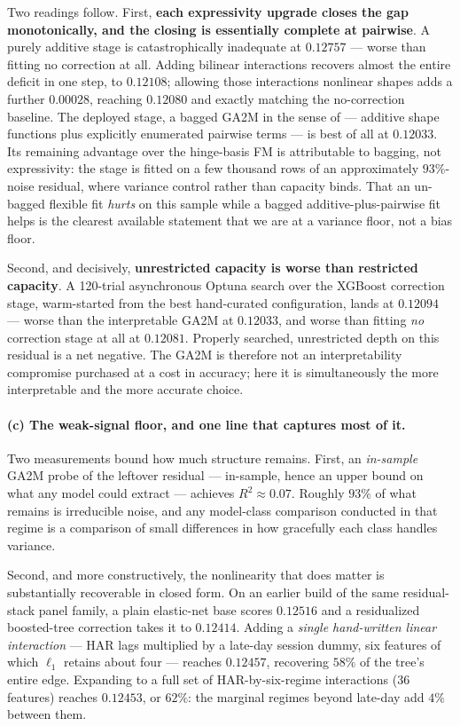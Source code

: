 Two readings follow. First, \textbf{each expressivity upgrade closes the gap
monotonically, and the closing is essentially complete at pairwise}. A purely
additive stage is catastrophically inadequate at $0.12757$ --- worse than fitting
no correction at all. Adding bilinear interactions recovers almost the entire
deficit in one step, to $0.12108$; allowing those interactions nonlinear shapes
adds a further $0.00028$, reaching $0.12080$ and exactly matching the
no-correction baseline. The deployed stage, a bagged GA2M in the sense of
\citet{Lou2013} --- additive shape functions plus explicitly enumerated pairwise
terms --- is best of all at $0.12033$. Its remaining advantage over the
hinge-basis FM is attributable to bagging, not expressivity: the stage is fitted
on a few thousand rows of an approximately $93\%$-noise residual, where variance
control rather than capacity binds. That an un-bagged flexible fit \emph{hurts}
on this sample while a bagged additive-plus-pairwise fit helps is the clearest
available statement that we are at a variance floor, not a bias floor.

Second, and decisively, \textbf{unrestricted capacity is worse than restricted
capacity}. A 120-trial asynchronous Optuna search over the XGBoost correction
stage, warm-started from the best hand-curated configuration, lands at $0.12094$
--- worse than the interpretable GA2M at $0.12033$, and worse than fitting
\emph{no} correction stage at all at $0.12081$. Properly searched, unrestricted
depth on this residual is a net negative. The GA2M is therefore not an
interpretability compromise purchased at a cost in accuracy; here it is
simultaneously the more interpretable and the more accurate choice.

\paragraph{(c) The weak-signal floor, and one line that captures most of it.}
Two measurements bound how much structure remains. First, an \emph{in-sample}
GA2M probe of the leftover residual --- in-sample, hence an upper bound on what
any model could extract --- achieves $R^2 \approx 0.07$. Roughly $93\%$ of what
remains is irreducible noise, and any model-class comparison conducted in that
regime is a comparison of small differences in how gracefully each class handles
variance.

Second, and more constructively, the nonlinearity that does matter is
substantially recoverable in closed form. On an earlier build of the same
residual-stack panel family, a plain elastic-net base scores $0.12516$ and a
residualized boosted-tree correction takes it to $0.12414$. Adding a \emph{single
hand-written linear interaction} --- HAR lags multiplied by a late-day session
dummy, six features of which $\ell_1$ retains about four --- reaches $0.12457$,
recovering $58\%$ of the tree's entire edge. Expanding to a full set of
HAR-by-six-regime interactions (36 features) reaches $0.12453$, or $62\%$: the
marginal regimes beyond late-day add $4\%$ between them.

